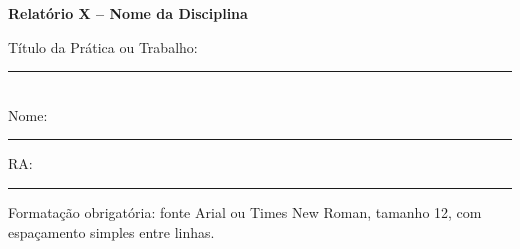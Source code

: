 \documentclass[a4paper,12pt]{article}
\begin{document}
    \thispagestyle{feb-header}

    \begin{center}
        \large
        \textbf{%
            Relatório X -- Nome da Disciplina%
        }
    \end{center}

    Título da Prática ou Trabalho: \rule{0.707\textwidth}{0.75pt}\\
    Nome: \rule{0.73\textwidth}{0.75pt} RA: \rule{0.16\textwidth}{0.75pt}

    \singlespacing
    \pagestyle{regular-header}

    Formatação obrigatória: fonte Arial ou Times New Roman, tamanho 12, com
    espaçamento simples entre linhas.
\end{document}
